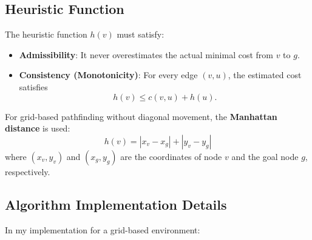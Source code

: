 \documentclass[12pt]{article}
\begin{document}
\subsection{Heuristic Function}
The heuristic function \( h(v) \) must satisfy:
\begin{itemize}
    \item \textbf{Admissibility}: It never overestimates the actual minimal cost from \( v \) to \( g \).
    \item \textbf{Consistency (Monotonicity)}: For every edge \( (v, u) \), the estimated cost satisfies
      \[
      h(v) \leq c(v, u) + h(u).
      \]
\end{itemize}

\noindent For grid-based pathfinding without diagonal movement, the \textbf{Manhattan distance} is used:
\[
h(v) = |x_v - x_g| + |y_v - y_g|
\]
\noindent where \( (x_v, y_v) \) and \( (x_g, y_g) \) are the coordinates of node \( v \) and the goal node \( g \), respectively.

\subsection{Algorithm Implementation Details}
In my implementation for a grid-based environment:
\end{document}

